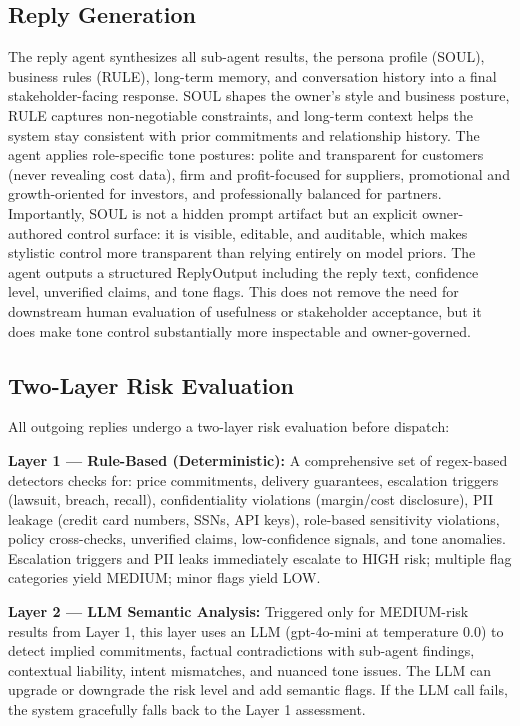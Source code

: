 \documentclass[11pt]{article}
\begin{document}
\subsection{Reply Generation}
The reply agent synthesizes all sub-agent results, the persona profile (SOUL), business rules (RULE), long-term memory, and conversation history into a final stakeholder-facing response. SOUL shapes the owner's style and business posture, RULE captures non-negotiable constraints, and long-term context helps the system stay consistent with prior commitments and relationship history. The agent applies role-specific tone postures: polite and transparent for customers (never revealing cost data), firm and profit-focused for suppliers, promotional and growth-oriented for investors, and professionally balanced for partners. Importantly, SOUL is not a hidden prompt artifact but an explicit owner-authored control surface: it is visible, editable, and auditable, which makes stylistic control more transparent than relying entirely on model priors. The agent outputs a structured ReplyOutput including the reply text, confidence level, unverified claims, and tone flags. This does not remove the need for downstream human evaluation of usefulness or stakeholder acceptance, but it does make tone control substantially more inspectable and owner-governed.

\subsection{Two-Layer Risk Evaluation}

All outgoing replies undergo a two-layer risk evaluation before dispatch:

\textbf{Layer 1 — Rule-Based (Deterministic):} A comprehensive set of regex-based detectors checks for: price commitments, delivery guarantees, escalation triggers (lawsuit, breach, recall), confidentiality violations (margin/cost disclosure), PII leakage (credit card numbers, SSNs, API keys), role-based sensitivity violations, policy cross-checks, unverified claims, low-confidence signals, and tone anomalies. Escalation triggers and PII leaks immediately escalate to HIGH risk; multiple flag categories yield MEDIUM; minor flags yield LOW.

\textbf{Layer 2 — LLM Semantic Analysis:} Triggered only for MEDIUM-risk results from Layer 1, this layer uses an LLM (gpt-4o-mini at temperature 0.0) to detect implied commitments, factual contradictions with sub-agent findings, contextual liability, intent mismatches, and nuanced tone issues. The LLM can upgrade or downgrade the risk level and add semantic flags. If the LLM call fails, the system gracefully falls back to the Layer 1 assessment.
\end{document}

